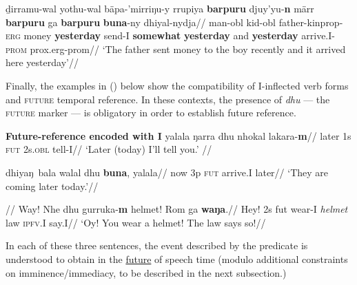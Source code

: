 \a{}\begingl\gla ḏirramu-wal yothu-wal bäpa-'mirriŋu-y rrupiya \textbf{barpuru} djuy'yu-\textbf{n} märr \textbf{barpuru} ga \textbf{barpuru} \textbf{buna}-ny dhiyal-nydja//
\glb man-\gls{obl} kid-\gls{obl} father-\gls{kinprop}-\textsc{erg} money \textbf{yesterday} send-\gls{I} \textbf{somewhat} \textbf{yesterday} and \textbf{yesterday} arrive.\gls{I}-\textsc{prom} \gls{prox}.\gls{erg}-\gls{prom}//
\glft`The father sent money to the boy recently and it arrived here yesterday'//\endgl

\xe


Finally, the examples in () below show the compatibility of \gls{I}-inflected verb forms and \textsc{future} temporal reference.  In these contexts, the presence of \textit{dhu} --- the \textsc{future} marker --- is obligatory in order to establish future reference. 

\pex {} \textbf{Future-reference encoded with \gls{I}}
\a{}\begingl\gla yalala ŋarra dhu nhokal lakara-\textbf{m}//
\glb later 1s \textsc{fut} 2s\textsc{.obl} tell-\gls{I}//
\glft `Later (today) I'll tell you.' //\endgl

\a{}\begingl \gla dhiyaŋ~bala walal dhu \textbf{buna}, yalala//
\glb now 3p \textsc{fut} arrive.\gls{I} later//
\glft`They are coming later today.'//\endgl


\a\begingl\glpreamble {}//
\gla Way! Nhe dhu gurruka-\textbf{m} helmet! Rom ga \textbf{waŋa}.//
\glb Hey! 2s \gls{fut} wear-\gls{I} \textit{helmet} law \textsc{ipfv.\gls{I}}  say.\gls{I}//
\glft`Oy! You wear a helmet! The law says so!\trailingcitation{[AW~20170730]}//\endgl


\xe


\noindent In each of these three sentences, the event described by the predicate is understood to obtain in the \underline{future} of speech time (modulo additional constraints on imminence/immediacy, to be described in the next subsection.)

